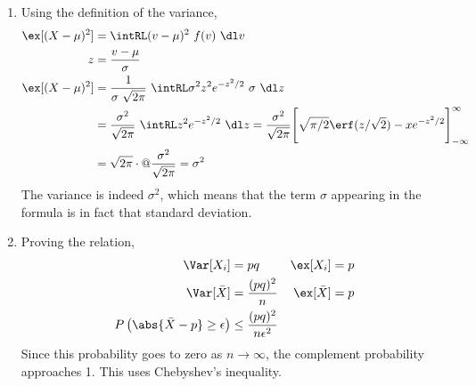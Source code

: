 \begin{enumerate}
\begin{enumerate}
              \item Using the definition of the variance,
                    \begin{align}
                        \ex[(X-\mu)^2]   & = \intRL (v-\mu)^2\ f(v)\ \dl v        \\
                        z                & = \frac{v - \mu}{\sigma}               \\
                        \ex[(X - \mu)^2] & = \frac{1}{\sigma\ \sqrt{2\pi}}
                        \ \intRL \sigma^2 z^2 e^{-z^2/2}\ \sigma\ \dl z           \\
                                         & = \frac{\sigma^2}{\sqrt{2\pi}}\ \intRL
                        z^2 e^{-z^2/2}\ \dl z
                        = \frac{\sigma^2}{\sqrt{2\pi}}
                        \Bigg[ \sqrt{\pi/2} \erf(z/\sqrt{2}) - xe^{-z^2/2}
                        \Bigg]_{-\infty}^\infty                                   \\
                                         & = \sqrt{2\pi} \cdot @ \frac{\sigma^2}
                        {\sqrt{2\pi}} = \sigma^2
                    \end{align}
                    The variance is indeed $ \sigma^2 $, which means that the term
                    $ \sigma $ appearing in the formula is in fact that standard
                    deviation.

              \item Proving the relation,
                    \begin{align}
                        \Var[X_i]     & = pq                            &
                        \ex[X_i]      & = p                               \\
                        \Var[\bar{X}] & = \frac{(pq)^2}{n}              &
                        \ex[\bar{X}]  & = p                               \\
                        P\left( \abs{\bar{X} - p}  \geq \epsilon\right)
                                      & \leq \frac{(pq)^2}{n\epsilon^2}
                    \end{align}
                    Since this probability goes to zero as $ n \to \infty $, the
                    complement probability approaches 1. This uses Chebyshev's
                    inequality.


\end{enumerate}
\end{enumerate}
